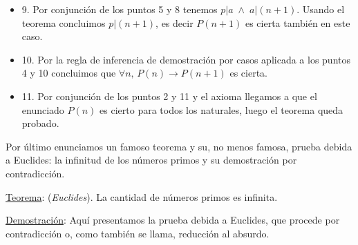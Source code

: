 \begin{itemize}
\item 9. Por conjunción de los puntos 5 y 8 tenemos $p|a \; \wedge \;  a|(n + 1)$. Usando el teorema  concluimos $p|(n + 1)$, es decir $P (n + 1)$ es cierta también en este caso.

\item 10. Por la regla de inferencia de demostración por casos aplicada a los puntos 4 y 10 concluimos que $ \forall n,\,  P (n) \to  P (n + 1)$ es cierta.

\item 11. Por conjunción de los puntos 2 y 11 y el axioma llegamos a que el enunciado $P(n)$ es cierto para todos los naturales, luego el teorema queda probado.

\end{itemize}
\rightline{$\Box$}


Por último enunciamos un famoso teorema y su, no menos famosa, prueba debida a Euclides: la infinitud de los números primos y su demostración por contradicción.



\underline{Teorema}: (\emph{Euclides}). La cantidad de números primos es infinita. 

\underline{Demostración}: Aquí presentamos la prueba debida a Euclides, que procede por contradicción o, como también se llama, reducción al absurdo.


